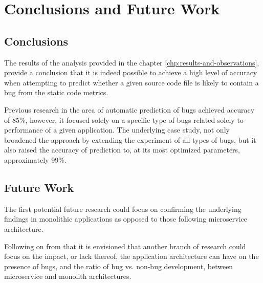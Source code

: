 \chapter{Conclusions and Future Work}\label{chp:conclusions-and-future-work}
\section{Conclusions}\label{sec:conlclusions}
The results of the analysis provided in the chapter \ref{chp:results-and-observations}, provide a conclusion that it is indeed possible to achieve a high level of accuracy when attempting to predict whether a given source code file is likely to contain a bug from the static code metrics. 

Previous research in the area of automatic prediction of bugs \cite{autoDetectionOfPerfBugs} achieved accuracy of 85\%, however, it focused solely on a specific type of bugs related solely to performance of a given application.
The underlying case study, not only broadened the approach by extending the experiment of all types of bugs, but it also raised the accuracy of prediction to, at its most optimized parameters, approximately 99\%.

\section{Future Work}\label{sec:future-work}
The first potential future research could focus on confirming the underlying findings in monolithic applications as opposed to those following microservice architecture.

Following on from that it is envisioned that another branch of research could focus on the impact, or lack thereof, the application architecture can have on the presence of bugs, and the ratio of bug vs. non-bug development, between microservice and monolith architectures.
